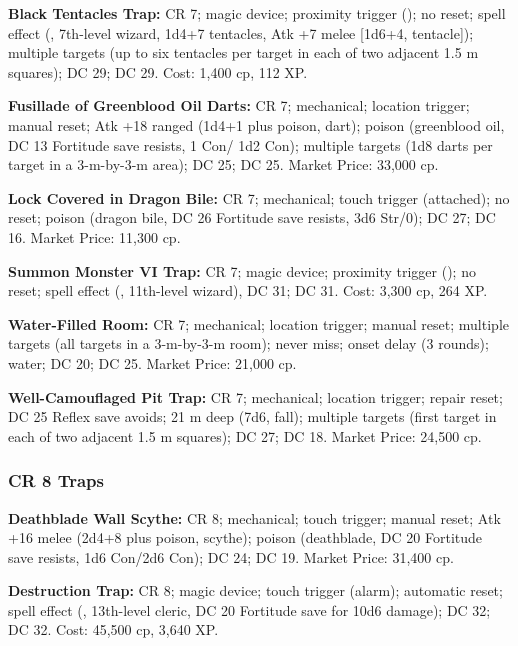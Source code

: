 \textbf{Black Tentacles Trap:} CR 7; magic device; proximity trigger (); no reset; spell effect (, 7th-level wizard, 1d4+7 tentacles, Atk +7 melee [1d6+4, tentacle]); multiple targets (up to six tentacles per target in each of two adjacent 1.5 m squares);  DC 29;  DC 29. Cost: 1,400 cp, 112 XP.

\textbf{Fusillade of Greenblood Oil Darts:} CR 7; mechanical; location trigger; manual reset; Atk +18 ranged (1d4+1 plus poison, dart); poison (greenblood oil, DC 13 Fortitude save resists, 1 Con/ 1d2 Con); multiple targets (1d8 darts per target in a 3-m-by-3-m area);  DC 25;  DC 25. Market Price: 33,000 cp.

\textbf{Lock Covered in Dragon Bile:} CR 7; mechanical; touch trigger (attached); no reset; poison (dragon bile, DC 26 Fortitude save resists, 3d6 Str/0);  DC 27;  DC 16. Market Price: 11,300 cp.

\textbf{Summon Monster VI Trap:} CR 7; magic device; proximity trigger (); no reset; spell effect (, 11th-level wizard),  DC 31;  DC 31. Cost: 3,300 cp, 264 XP.

\textbf{Water-Filled Room:} CR 7; mechanical; location trigger; manual reset; multiple targets (all targets in a 3-m-by-3-m room); never miss; onset delay (3 rounds); water;  DC 20;  DC 25. Market Price: 21,000 cp.

\textbf{Well-Camouflaged Pit Trap:} CR 7; mechanical; location trigger; repair reset; DC 25 Reflex save avoids; 21 m deep (7d6, fall); multiple targets (first target in each of two adjacent 1.5 m squares);  DC 27;  DC 18. Market Price: 24,500 cp.

\subsubsection{CR 8 Traps}
\textbf{Deathblade Wall Scythe:} CR 8; mechanical; touch trigger; manual reset; Atk +16 melee (2d4+8 plus poison, scythe); poison (deathblade, DC 20 Fortitude save resists, 1d6 Con/2d6 Con);  DC 24;  DC 19. Market Price: 31,400 cp.

\textbf{Destruction Trap:} CR 8; magic device; touch trigger (alarm); automatic reset; spell effect (, 13th-level cleric, DC 20 Fortitude save for 10d6 damage);  DC 32;  DC 32. Cost: 45,500 cp, 3,640 XP.

